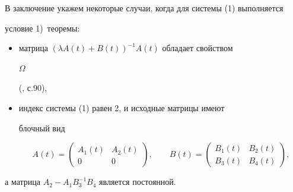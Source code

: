 В заключение укажем некоторые случаи, когда для системы (1) выполняется


условие 1)~теоремы:


\begin{itemize}


\item[а)] матрица $(\lambda A(t)+B(t))^{-1}A(t)$ обладает свойством


$\Omega$


(\cite{Boy}, с.90),\\


\item[б)] индекс системы (1) равен 2, и исходные матрицы имеют


блочный вид


$$


A(t)=


\begin{pmatrix}


A_1(t) & A_2(t)\\


0 & 0


\end{pmatrix}


,\qquad B(t)=


\begin{pmatrix}


B_1(t) & B_2(t)\\


B_3(t) & B_4(t)


\end{pmatrix}


,


$$


\end{itemize}


а матрица $A_2-A_1B^{-1}_3B_4$ является постоянной.









